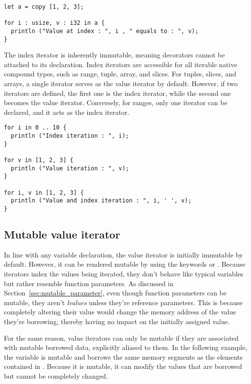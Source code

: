 \begin{lstlisting}[style=coloredverbatim, escapechar=@]
let a = copy [1, 2, 3];

for i : usize, v : i32 in a {
  println ("Value at index : ", i , " equals to : ", v);
}
\end{lstlisting}

The index iterator is inherently immutable, meaning decorators cannot be
attached to its declaration. Index iterators are accessible for all iterable
native compound types, such as range, tuple, array, and slices. For tuples,
slices, and arrays, a single iterator serves as the value iterator by default.
However, if two iterators are defined, the first one is the index iterator,
while the second one becomes the value iterator. Conversely, for ranges, only
one iterator can be declared, and it acts as the index iterator.

\begin{lstlisting}[style=coloredverbatim, escapechar=@]
for i in 0 .. 10 {
  println ("Index iteration : ", i);
}

for v in [1, 2, 3] {
  println ("Value iteration : ", v);
}

for i, v in [1, 2, 3] {
  println ("Value and index iteration : ", i, ' ', v);
}
\end{lstlisting}

\subsection {Mutable value iterator}
\label{sec:mut_value_iterators}

In line with any variable declaration, the value iterator is initially immutable
by default. However, it can be rendered mutable by using the keywords
 or . Because iterators index the values being iterated,
they don't behave like typical variables but rather resemble function
parameters. As discussed in Section~\ref{sec:mutable_parameter}, even though
function parameters can be mutable, they aren't \textit{lvalues} unless they're
reference parameters. This is because completely altering their value would
change the memory address of the value they're borrowing, thereby having no
impact on the initially assigned value.

For the same reason, value iterators can only be mutable if they are associated
with mutable borrowed data, explicitly aliased to them. In the following
example, the variable  is mutable and borrows the same memory segments
as the elements contained in . Because it is mutable, it can modify
the values that are borrowed but cannot be completely changed.

